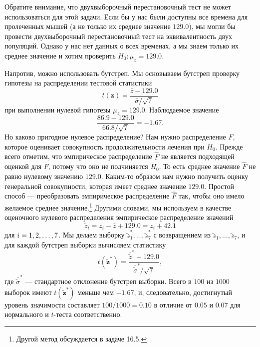 Обратите внимание, что двухвыборочный перестановочный тест не может использоваться для этой задачи. Если бы у нас были доступны все времена для пролеченных мышей (а не только их среднее значение $129.0$), мы могли бы провести двухвыборочный перестановочный тест на эквивалентность двух популяций. Однако у нас нет данных о всех временах, а мы знаем только их среднее значение и хотим проверить $H_0: \mu_z = 129.0$.

Напротив, можно использовать бутстреп. Мы основываем бутстреп проверку гипотезы на распределении тестовой статистики
\begin{equation}\label{eq16.14}
    t(\mathbf{z}) = \frac{\bar{z}-129.0}{\bar{\sigma}/\sqrt{7}}
\end{equation}
при выполнении нулевой гипотезы $\mu_z = 129.0$. Наблюдаемое значение
\begin{equation}\label{eq16.15}
    \frac{86.9-129.0}{66.8/\sqrt{7}} = -1.67.
\end{equation}
Но каково пригодное нулевое распределение? Нам нужно распределение $F$, которое оценивает совокупность продолжительности лечения при $H_0$. Прежде всего отметим, что эмпирическое распределение $\hat{F}$ не является подходящей оценкой для $F$, потому что оно не подчиняется $H_0$. То есть среднее значение $\hat{F}$ не равно нулевому значению $129.0$. Каким-то образом нам нужно получить оценку генеральной совокупности, которая имеет среднее значение $129.0$. Простой способ --- преобразовать эмпирическое распределение $\hat{F}$ так, чтобы оно имело желаемое среднее значение.\footnote{Другой метод обсуждается в задаче 16.5.} Другими словами, мы используем в качестве оценочного нулевого распределения эмпирическое распределение значений
\begin{equation}\label{eq16.16}
    \widetilde{z}_i = z_i - \bar{z} + 129.0 = z_i+42.1
\end{equation}
для $i = 1,2,\ldots,7$. Мы делаем выборку $\widetilde{z}^{*}_1,\ldots,\widetilde{z}^{*}_7$ с возвращением из $\widetilde{z}_1,\ldots,\widetilde{z}_7$, и для каждой бутстреп выборки вычисляем статистику
\begin{equation}\label{eq16.17}
    t(\mathbf{\widetilde{z}}^{*}) = \frac{\bar{\widetilde{z}}^{*}-129.0}{\bar{\widetilde{\sigma}}^{*}/\sqrt{7}},
\end{equation}
где $\bar{\widetilde{\sigma}}^{*}$ --- стандартное отклонение бутстреп выборки. Всего в $100$ из $1000$ выборок имеют $t(\mathbf{\widetilde{z}}^{*})$ меньше чем $-1.67$, и, следовательно, достигнутый уровень значимости составляет $100/1000 = 0.10$ в отличие от $0.05$ и $0.07$ для нормального и $t$-теста соответственно.

